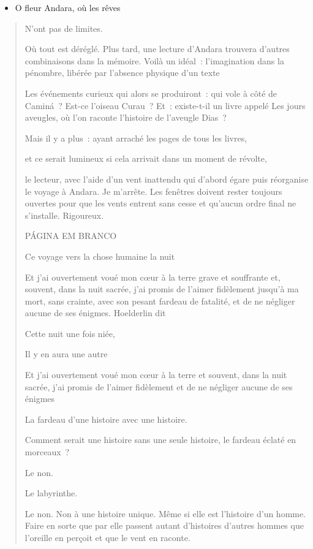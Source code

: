\begin{itemize}
\item
  O fleur Andara, où les rêves
\end{itemize}

\begin{quote}
N'ont pas de limites.

Où tout est déréglé. Plus tard, une lecture d'Andara trouvera d'autres
combinaisons dans la mémoire. Voilà un idéal~: l'imagination dans la
pénombre, libérée par l'absence physique d'un texte

Les événements curieux qui alors se produiront~: qui vole à côté de
Caminá~? Est-ce l'oiseau Curau~? Et~: existe-t-il un livre appelé Les
jours aveugles, où l'on raconte l'histoire de l'aveugle Dias~?

Mais il y a plus~: ayant arraché les pages de tous les livres,

et ce serait lumineux si cela arrivait dans un moment de révolte,

le lecteur, avec l'aide d'un vent inattendu qui d'abord égare puis
réorganise le voyage à Andara. Je m'arrête. Les fenêtres doivent rester
toujours ouvertes pour que les vents entrent sans cesse et qu'aucun
ordre final ne s'installe. Rigoureux.

PÁGINA EM BRANCO

Ce voyage vers la chose humaine la nuit

Et j'ai ouvertement voué mon cœur à la terre grave et souffrante et,
souvent, dans la nuit sacrée, j'ai promis de l'aimer fidèlement jusqu'à
ma mort, sans crainte, avec son pesant fardeau de fatalité, et de ne
négliger aucune de ses énigmes. Hoelderlin dit

Cette nuit une fois niée,

Il y en aura une autre

Et j'ai ouvertement voué mon cœur à la terre et souvent, dans la nuit
sacrée, j'ai promis de l'aimer fidèlement et de ne négliger aucune de
ses énigmes

La fardeau d'une histoire avec une histoire.

Comment serait une histoire sans une seule histoire, le fardeau éclaté
en morceaux~?

Le non.

Le labyrinthe.

Le non. Non à une histoire unique. Même si elle est l'histoire d'un
homme. Faire en sorte que par elle passent autant d'histoires d'autres
hommes que l'oreille en perçoit et que le vent en raconte.


\end{quote}
